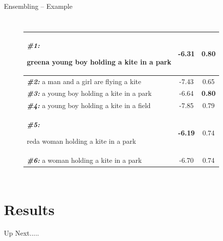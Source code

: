 \documentclass{beamer}
\newcommand{\red}[1]{\protect\begin{color}{red}#1\protect\end{color}}
\newcommand{\green}[1]{\protect\begin{color}{green}#1\protect\end{color}}
\begin{document}
\begin{frame}{Ensembling -- Example}
\begin{columns}
\begin{figure}[thp]
\begin{center}
{\begin{tabular}{|l|c|c|}
        \textbf{\scriptsize\em \#1:} \scriptsize \green{a young boy holding a kite in a park} & -6.31 &\bf 0.80 \\\hline
        \textbf{\scriptsize\em \#2:} \scriptsize a man and a girl are flying a kite    & -7.43 & 0.65 \\\hline
        \textbf{\scriptsize\em \#3:} \scriptsize a young boy holding a kite in a park  & -6.64 &\bf 0.80 \\\hline
        \textbf{\scriptsize\em \#4:} \scriptsize a young boy holding a kite in a field & -7.85 & 0.79 \\\hline
        \textbf{\scriptsize\em \#5:} \scriptsize \red{a woman holding a kite in a park}&\bf-6.19 & 0.74 \\\hline
        \textbf{\scriptsize\em \#6:} \scriptsize a woman holding a kite in a park      & -6.70 & 0.74 \\\hline
      \end{tabular}
      }
        \vfill
      \end{center}
    \end{figure}
\end{columns}
\end{frame}
\section{Results}
\begin{frame}{Up Next.....}
\tableofcontents[currentsection] 
\end{frame}
\end{document}
